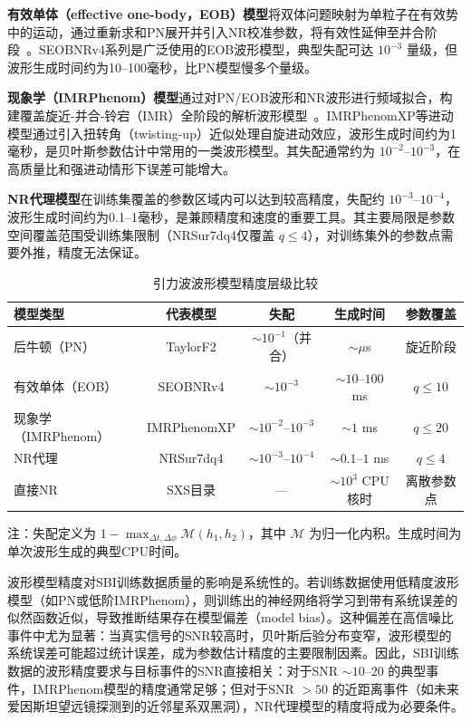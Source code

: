 \textbf{有效单体（effective one-body，EOB）模型}将双体问题映射为单粒子在有效势中的运动，通过重新求和PN展开并引入NR校准参数，将有效性延伸至并合阶段~\cite{Bohe2017SEOBNRv4}。SEOBNRv4系列是广泛使用的EOB波形模型，典型失配可达 $10^{-3}$ 量级，但波形生成时间约为10--100毫秒，比PN模型慢多个量级。

\textbf{现象学（IMRPhenom）模型}通过对PN/EOB波形和NR波形进行频域拟合，构建覆盖旋近-并合-铃宕（IMR）全阶段的解析波形模型~\cite{Pratten2021IMRPhenomX}。IMRPhenomXP等进动模型通过引入扭转角（twisting-up）近似处理自旋进动效应，波形生成时间约为1毫秒，是贝叶斯参数估计中常用的一类波形模型。其失配通常约为 $10^{-2}$--$10^{-3}$，在高质量比和强进动情形下误差可能增大。

\textbf{NR代理模型}在训练集覆盖的参数区域内可以达到较高精度，失配约 $10^{-3}$--$10^{-4}$，波形生成时间约为0.1--1毫秒，是兼顾精度和速度的重要工具。其主要局限是参数空间覆盖范围受训练集限制（NRSur7dq4仅覆盖 $q \leq 4$），对训练集外的参数点需要外推，精度无法保证。

\begin{table}[htbp]
\centering
\caption{引力波波形模型精度层级比较}
\label{tab:waveform_hierarchy}
\begin{tabular}{lcccc}
\hline
\textbf{模型类型} & \textbf{代表模型} & \textbf{失配} & \textbf{生成时间} & \textbf{参数覆盖} \\
\hline
后牛顿（PN） & TaylorF2 & $\sim 10^{-1}$（并合） & $\sim \mu$s & 旋近阶段 \\
有效单体（EOB） & SEOBNRv4 & $\sim 10^{-3}$ & $\sim 10$--$100$ ms & $q \leq 10$ \\
现象学（IMRPhenom） & IMRPhenomXP & $\sim 10^{-2}$--$10^{-3}$ & $\sim 1$ ms & $q \leq 20$ \\
NR代理 & NRSur7dq4 & $\sim 10^{-3}$--$10^{-4}$ & $\sim 0.1$--$1$ ms & $q \leq 4$ \\
直接NR & SXS目录 & — & $\sim 10^3$ CPU核时 & 离散参数点 \\
\hline
\end{tabular}
\begin{minipage}{\linewidth}
\vspace{1mm}
\small 注：失配定义为 $1 - \max_{\Delta t, \Delta\phi}\mathcal{M}(h_1, h_2)$，其中 $\mathcal{M}$ 为归一化内积。生成时间为单次波形生成的典型CPU时间。
\end{minipage}
\end{table}

波形模型精度对SBI训练数据质量的影响是系统性的。若训练数据使用低精度波形模型（如PN或低阶IMRPhenom），则训练出的神经网络将学习到带有系统误差的似然函数近似，导致推断结果存在模型偏差（model bias）。这种偏差在高信噪比事件中尤为显著：当真实信号的SNR较高时，贝叶斯后验分布变窄，波形模型的系统误差可能超过统计误差，成为参数估计精度的主要限制因素。因此，SBI训练数据的波形精度要求与目标事件的SNR直接相关：对于SNR $\sim 10$--$20$ 的典型事件，IMRPhenom模型的精度通常足够；但对于SNR $> 50$ 的近距离事件（如未来爱因斯坦望远镜探测到的近邻星系双黑洞），NR代理模型的精度将成为必要条件。

